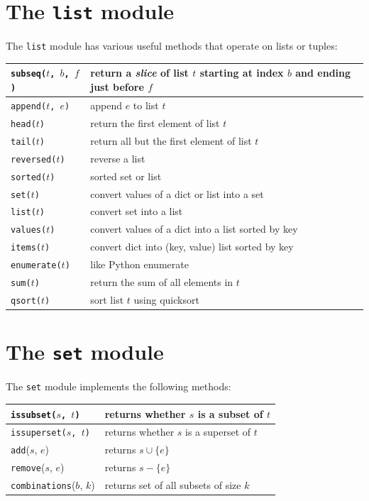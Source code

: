 \documentclass{report}
\begin{document}
\section{The \texttt{list} module}
\label{ap:list}

%
The \texttt{list} module has various useful methods that operate on lists
or tuples:

\vspace{1em}
\begin{tabular}{|l|l|}
\hline
\texttt{subseq($t$, $b$, $f$)} & return a \emph{slice} of list $t$ starting
at index $b$ and ending just before $f$\\
\hline
\texttt{append($t$, $e$)} & append $e$ to list $t$\\
\hline
\texttt{head($t$)} & return the first element of list $t$\\
\hline
\texttt{tail($t$)} & return all but the first element of list $t$\\
\hline
\texttt{reversed($t$)} & reverse a list \\
\hline
\texttt{sorted($t$)} & sorted set or list \\
\hline
\texttt{set($t$)} & convert values of a dict or list into a set \\
\hline
\texttt{list($t$)} & convert set into a list \\
\hline
\texttt{values($t$)} & convert values of a dict into a list sorted by key \\
\hline
\texttt{items($t$)} & convert dict into (key, value) list sorted by key \\
\hline
\texttt{enumerate($t$)} & like Python enumerate \\
\hline
\texttt{sum($t$)} & return the sum of all elements in $t$\\
\hline
\texttt{qsort($t$)} & sort list $t$ using quicksort\\
\hline
\end{tabular}

\section{The \texttt{set} module}
\label{ap:set}

The \texttt{set} module
%
implements the following methods:

\vspace{1em}
\begin{tabular}{|l|l|}
\hline
\texttt{issubset($s$, $t$)} & returns whether $s$ is a subset of $t$ \\
\hline
\texttt{issuperset($s$, $t$)} & returns whether $s$ is a superset of $t$ \\
\hline
\texttt{add}($s$, $e$) & returns $s \cup \{ e \}$ \\
\hline
\texttt{remove}($s$, $e$) & returns $s - \{ e \}$ \\
\hline
\texttt{combinations}($b$, $k$) & returns set of all subsets of size $k$ \\
\hline
\end{tabular}
\end{document}

